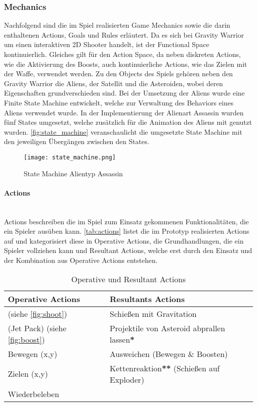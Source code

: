 \documentclass[11pt]{scrartcl}
\newcommand{\lbparagraph}[1]{\paragraph*{#1}\mbox{}\\}
\begin{document}
\subsubsection{Mechanics}
\label{subsec:mec}
Nachfolgend sind die im Spiel realisierten Game Mechanics sowie die darin enthaltenen Actions, Goals und Rules erläutert. Da es sich bei Gravity Warrior um einen interaktiven 2D Shooter handelt, ist der Functional Space\cite[~p.133]{S2014} kontinuierlich. Gleiches gilt für den Action Space, da neben diskreten Actions, wie die Aktivierung des Boosts, auch kontinuierliche Actions, wie das Zielen mit der Waffe, verwendet werden. Zu den Objects des Spiels gehören neben den Gravity Warrior die Aliens, der Satellit und die Asteroiden, wobei deren Eigenschaften grundverschieden sind. Bei der Umsetzung der Aliens wurde eine Finite State Machine entwickelt, welche zur Verwaltung des Behaviors eines Aliens verwendet wurde. In der Implementierung der Alienart Assassin wurden fünf States umgesetzt, welche zusätzlich für die Animation des Aliens mit genutzt wurden. \autoref{fig:state_machine} veranschaulicht die umgesetzte State Machine mit den jeweiligen Übergängen zwischen den States.

\begin{figure}[htp]
	\centering
	\texttt{[image: state\_machine.png]}
	\caption{State Machine Alientyp Assassin}
	\label{fig:state_machine}
\end{figure}

\lbparagraph{Actions}
Actions beschreiben die im Spiel zum Einsatz gekommenen Funktionalitäten, die ein Spieler ausüben kann. \autoref{tab:actions} listet die im Prototyp realisierten Actions auf und kategorisiert diese in Operative Actions, die Grundhandlungen, die ein Spieler vollziehen kann und Resultant Actions, welche erst durch den Einsatz und der Kombination aus Operative Actions entstehen\cite[~p.140]{S2014}.


\begin{table}[htp]
\centering
\begin{tabular}{|l|l|}
\hline
\textbf{Operative Actions}&\textbf{Resultants Actions} \\
\hline
\nameref{fig:shoot} (siehe \autoref{fig:shoot})&Schießen mit Gravitation \\
\hline
\nameref{fig:boost} (Jet Pack) (siehe \autoref{fig:boost})&Projektile von Asteroid abprallen lassen\textbf{*}\\
\hline
Bewegen (x,y)&Ausweichen (Bewegen \& Boosten)\\
\hline
Zielen (x,y)&Kettenreaktion\textbf{**} (Schießen auf Exploder)\\
\hline
Wiederbeleben&\\
\hline
\end{tabular}
\caption{Operative und Resultant Actions}
\label{tab:actions}
\end{table}
\end{document}
